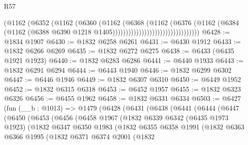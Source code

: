 \begin{lexlean}{R57}
\begin{coremodule}
                                              (@1162
                                                (@6352
                                                  (@1162
                                                    (@6360
                                                      (@1162
                                                        (@6368
                                                          (@1162
                                                            (@6376
                                                              (@1162
                                                                (@6384
                                                                  (@1162
                                                                    (@6388
                                                                      @6390
                                                                      @1218
                                                                      @1405)))))))))))))))))))))))))))))))))
@6428 := @1834 @1907
@6430 := @1832 @6258 @6261
@6431 := @6430 @1912
@6433 := @1832 @6266 @6269
@6435 := @1832 @6272 @6275
@6438 := @6433 (@6435 @1921 @1923)
@6440 := @1832 @6283 @6286
@6441 := @6440 @1933
@6443 := @1832 @6291 @6294
@6444 := @6443 @1940
@6446 := @1832 @6299 @6302
@6447 := @6446 @1946
@6449 := @1832 @6307 @6310
@6450 := @6449 @1952
@6452 := @1832 @6315 @6318
@6453 := @6452 @1957
@6455 := @1832 @6323 @6326
@6456 := @6455 @1962
@6458 := @1832 @6331 @6334
@6503 := @6427
    (fun (__b : @1013) =>
    @1479
      (@6428
        (@6431
          (@6438
            (@6441
              (@6444
                (@6447
                  (@6450
                    (@6453
                      (@6456
                        (@6458
                          @1967
                          (@1832
                            @6339
                            @6342
                            (@6435 @1973 @1923)
                            (@1832
                              @6347
                              @6350
                              @1983
                              (@1832
                                @6355
                                @6358
                                @1991
                                (@1832
                                  @6363
                                  @6366
                                  @1995
                                  (@1832
                                    @6371
                                    @6374
                                    @2001
                                    (@1832

\end{coremodule}
\end{lexlean}
